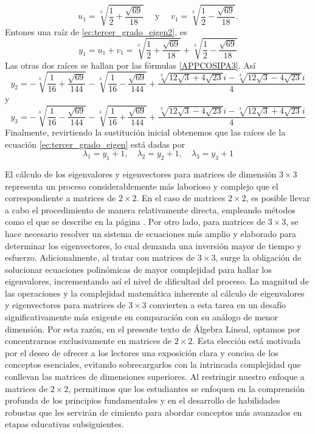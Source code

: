 \begin{example}
    $$u_1=\sqrt[3]{\frac{1}{2}+\frac{\sqrt{69}}{18}} \quad \text{ y } \quad v_1=\sqrt[3]{\frac{1}{2}-\frac{\sqrt{69}}{18}}.$$
    Entones una raíz de \eqref{ec:tercer_grado_eigen2}, es
    $$y_1 = u_1 + v_1 = \sqrt[3]{\frac{1}{2}+\frac{\sqrt{69}}{18}} + \sqrt[3]{\frac{1}{2}-\frac{\sqrt{69}}{18}}$$
    Las otras dos raíces se hallan por las fórmulas \eqref{APPCOSIPA3}. Así
    $$y_2 = -\sqrt[3]{\frac{1}{16}+\frac{\sqrt{69}}{144}}-\sqrt[3]{\frac{1}{16}-\frac{\sqrt{69}}{144}}+\frac{\sqrt[3]{12 \sqrt{3}+4 \sqrt{23}} i-\sqrt[3]{12 \sqrt{3}-4 \sqrt{23}} i}{4}$$
    y
    $$y_3 = -\sqrt[3]{\frac{1}{16}-\frac{\sqrt{69}}{144}}-\sqrt[3]{\frac{1}{16}+\frac{\sqrt{69}}{144}}+\frac{\sqrt[3]{12 \sqrt{3}-4 \sqrt{23}} i-\sqrt[3]{12 \sqrt{3}+4 \sqrt{23}} i}{4}$$
    Finalmente, revirtiendo la sustitución inicial obtenemos que las raíces de la ecuación \eqref{ec:tercer_grado_eigen} está dadas por
    $$\lambda_1 = y_1 + 1, \quad \lambda_2 = y_2 + 1, \quad \lambda_3 = y_3 + 1$$
\end{example}

\begin{observation}
    El cálculo de los eigenvalores y eigenvectores para matrices de dimensión $3 \times 3$ representa un proceso considerablemente más laborioso y complejo que el correspondiente a matrices de $2 \times 2$. En el caso de matrices $2 \times 2$, es posible llevar a cabo el procedimiento de manera relativamente directa, empleando métodos como el que se describe en la página \pageref{metodo_eigen_2x2}. Por otro lado, para matrices de $3 \times 3$, se hace necesario resolver un sistema de ecuaciones más amplio y elaborado para determinar los eigenvectores, lo cual demanda una inversión mayor de tiempo y esfuerzo. Adicionalmente, al tratar con matrices de $3 \times 3$, surge la obligación de solucionar ecuaciones polinómicas de mayor complejidad para hallar los eigenvalores, incrementando así el nivel de dificultad del proceso. La magnitud de las operaciones y la complejidad matemática inherente al cálculo de eigenvalores y eigenvectores para matrices de $3 \times 3$ convierten a esta tarea en un desafío significativamente más exigente en comparación con su análogo de menor dimensión. \newpage
    Por esta razón, en el presente texto de Álgebra Lineal, optamos por concentrarnos exclusivamente en matrices de $2 \times 2$. Esta elección está motivada por el deseo de ofrecer a los lectores una exposición clara y concisa de los conceptos esenciales, evitando sobrecargarlos con la intrincada complejidad que conllevan las matrices de dimensiones superiores. Al restringir nuestro enfoque a matrices de $2 \times 2$, permitimos que los estudiantes se enfoquen en la comprensión profunda de los principios fundamentales y en el desarrollo de habilidades robustas que les servirán de cimiento para abordar conceptos más avanzados en etapas educativas subsiguientes.
\end{observation}

